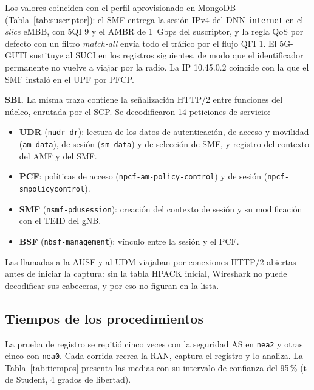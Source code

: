 \documentclass[conference]{IEEEtran}
\begin{document}
Los valores coinciden con el perfil aprovisionado en MongoDB (Tabla~\ref{tab:suscriptor}): el SMF entrega la sesión IPv4 del DNN \texttt{internet} en el \textit{slice} eMBB, con 5QI 9 y el AMBR de 1~Gbps del suscriptor, y la regla QoS por defecto con un filtro \textit{match-all} envía todo el tráfico por el flujo QFI 1. El 5G-GUTI sustituye al SUCI en los registros siguientes, de modo que el identificador permanente no vuelve a viajar por la radio. La IP 10.45.0.2 coincide con la que el SMF instaló en el UPF por PFCP.

\textbf{SBI.} La misma traza contiene la señalización HTTP/2 entre funciones del núcleo, enrutada por el SCP. Se decodificaron 14 peticiones de servicio:
\begin{itemize}
  \raggedright
  \item \textbf{UDR} (\texttt{nudr-dr}): lectura de los datos de autenticación, de acceso y movilidad (\texttt{am-data}), de sesión (\texttt{sm-data}) y de selección de SMF, y registro del contexto del AMF y del SMF.
  \item \textbf{PCF}: políticas de acceso (\texttt{npcf-am-policy-control}) y de sesión (\texttt{npcf-smpolicycontrol}).
  \item \textbf{SMF} (\texttt{nsmf-pdusession}): creación del contexto de sesión y su modificación con el TEID del gNB.
  \item \textbf{BSF} (\texttt{nbsf-management}): vínculo entre la sesión y el PCF.
\end{itemize}
Las llamadas a la AUSF y al UDM viajaban por conexiones HTTP/2 abiertas antes de iniciar la captura: sin la tabla HPACK inicial, Wireshark no puede decodificar sus cabeceras, y por eso no figuran en la lista.

\subsection{Tiempos de los procedimientos}
La prueba de registro se repitió cinco veces con la seguridad AS en \texttt{nea2} y otras cinco con \texttt{nea0}. Cada corrida recrea la RAN, captura el registro y lo analiza. La Tabla~\ref{tab:tiempos} presenta las medias con su intervalo de confianza del 95\,\% (t de Student, 4 grados de libertad).
\end{document}
